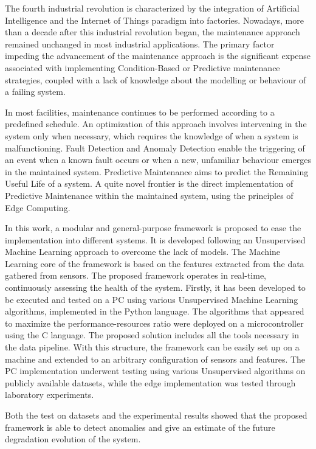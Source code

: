 
The fourth industrial revolution is characterized by the integration of Artificial Intelligence and the Internet of Things paradigm into factories. Nowadays, more than a decade after this industrial revolution began, the maintenance approach remained unchanged in most industrial applications. The primary factor impeding the advancement of the maintenance approach is the significant expense associated with implementing Condition-Based or Predictive maintenance strategies, coupled with a lack of knowledge about the modelling or behaviour of a failing system.

In most facilities, maintenance continues to be performed according to a predefined schedule. An optimization of this approach involves intervening in the system only when necessary, which requires the knowledge of when a system is malfunctioning. Fault Detection and Anomaly Detection enable the triggering of an event when a known fault occurs or when a new, unfamiliar behaviour emerges in the maintained system. Predictive Maintenance aims to predict the Remaining Useful Life of a system. A quite novel frontier is the direct implementation of Predictive Maintenance within the maintained system, using the principles of Edge Computing.

In this work, a modular and general-purpose framework is proposed to ease the implementation into different systems. It is developed following an Unsupervised Machine Learning approach to overcome the lack of models. The Machine Learning core of the framework is based on the features extracted from the data gathered from sensors. The proposed framework operates in real-time, continuously assessing the health of the system. Firstly, it has been developed to be executed and tested on a PC using various Unsupervised Machine Learning algorithms, implemented in the Python language. The algorithms that appeared to maximize the performance-resources ratio were deployed on a microcontroller using the C language. The proposed solution includes all the tools necessary in the data pipeline. With this structure, the framework can be easily set up on a machine and extended to an arbitrary configuration of sensors and features. The PC implementation underwent testing using various Unsupervised algorithms on publicly available datasets, while the edge implementation was tested through laboratory experiments.

Both the test on datasets and the experimental results showed that the proposed framework is able to detect anomalies and give an estimate of the future degradation evolution of the system. 
